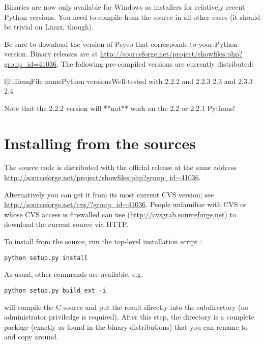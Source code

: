 \documentclass{manual}
\begin{document}
Binaries are now only available for Windows as installers for relatively recent Python versions.  You need to compile from the source in all other cases (it should be trivial on Linux, though).

Be sure to download the version of Psyco that corresponds to your Python version.  Binary releases are at \url{http://sourceforge.net/project/showfiles.php?group_id=41036}.  The following pre-compiled versions are currently distributed:

\begin{tableiii}{l|l|l}{filenq}{File name}{Python versions}{Well-tested with}
     {2.2.2 and 2.2.3}
       {2.3 and 2.3.3}
       {2.4}
\end{tableiii}

Note that the 2.2.2 version will **not** work on the 2.2 or 2.2.1 Pythons!


\section{Installing from the sources}\label{sources}

The source code is distributed with the official release at the same address \url{http://sourceforge.net/project/showfiles.php?group_id=41036}.

Alternatively you can get it from its most current CVS version; see \url{http://sourceforge.net/cvs/?group_id=41036}. People unfamiliar with CVS or whose CVS access is firewalled can use  (\url{http://cvsgrab.sourceforge.net}) to download the current source via HTTP.

To install from the source, run the top-level installation script :

\begin{verbatim}
python setup.py install
\end{verbatim}

As usual, other commands are available, e.g.\ 

\begin{verbatim}
python setup.py build_ext -i
\end{verbatim}

will compile the C source and put the result directly into the  subdirectory (no administrator priviledge is required). After this step, the  directory is a complete package (exactly as found in the binary distributions) that you can rename to  and copy around.
\end{document}
